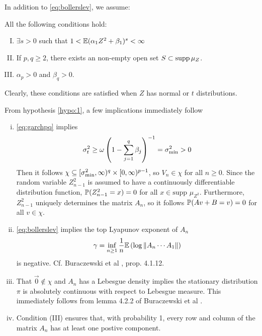 In addition to \eqref{eq:bollerslev}, we assume:
\begin{hypothesis}
  All the following conditions hold:
  \label{hypo:1}
  \begin{enumerate}[(I)]
  \item $\exists s > 0$ such that
    $1 < \E (\alpha_1 Z^2 + \beta_1)^s < \infty$
  \item If $p, q \geq 2$, there exists an non-empty open set
    $S \subset \supp \mu_Z$.
  \item $\alpha_p > 0$  and $\beta_q > 0$.
  \end{enumerate}
\end{hypothesis}
Clearly, these conditions are satisfied when $Z$ has normal or $t$
distributions.
\begin{remark}
  \label{remark:fhrtgh}
  From hypothesis \ref{hypo:1}, a few implications immediately follow
  \begin{enumerate}[(i)]
  \item \eqref{eq:garchpq} implies
    \[
    \sigma_t^2 \geq \omega \left(
      1 - \sum_{j=1}^q \beta_j
    \right)^{-1} = \sigma_{\m}^2 > 0
    \]
    Then it follows
    $\chi \subseteq [\sigma_{\m}^2, \infty)^q \times [0, \infty)^{p-1}$, so
    $V_n \in \chi$ for all $n \geq 0$. Since the random variable
    $Z_{n-1}^2$ is assumed to have a continuously differentiable
    distribution function,
    $\P(Z_{n-1}^2 = x) = 0$ for all $x \in \text{supp } \mu_{Z^2}$.
    Furthermore, $Z_{n-1}^2$ uniquely determines the matrix $A_n$,
    so it follows $\P(A v + B = v) = 0$ for all $v \in \chi$.
  \item \eqref{eq:bollerslev} implies the top Lyapunov exponent of $A_n$
    \begin{equation}
      \label{eq:Lyapunov}
      \gamma = \inf_{n \geq 1} {1 \over n}
      \E \left(\log \| A_n \cdots A_1 \| \right)    
    \end{equation}
    is negative. Cf. Buraczewski et al
    \cite{buraczewski:damek:mikosch:2016}, prop. 4.1.12.

  \item That $\vec 0 \notin \chi$ and $A_n$ has a Lebesgue density
    implies the stationary distribution $\pi$ is absolutely continuous with
    respect to Lebesgue measure. This immediately follows from lemma
    4.2.2 of Buraczewski et al \cite{buraczewski:damek:mikosch:2016}.

  \item Condition (III) ensures that, with probability 1, every row and
    column of the matrix $A_n$ has at least one postive component.
  \end{enumerate}
\end{remark}
